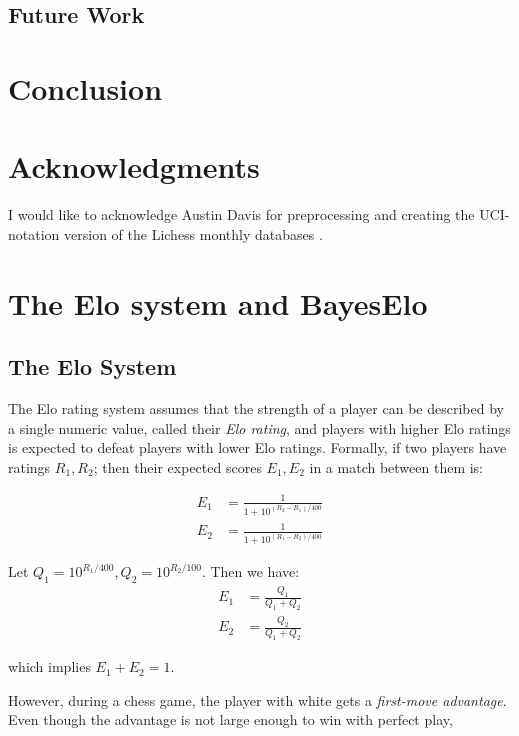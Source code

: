 \documentclass[11pt, a4paper]{article}
\begin{document}
\subsection{Future Work}

\section{Conclusion}

\section{Acknowledgments}

I would like to acknowledge Austin Davis for preprocessing and creating the UCI-notation version of the Lichess monthly databases \citep{davis-2024}.

\printbibliography

\pagebreak
\appendix
\section{The Elo system and BayesElo} 

\subsection{The Elo System} \label{subsec:the-elo-system}
The Elo rating system \citep{elo-1986} assumes that the strength of a player can be described by a single numeric value, called their \textit{Elo rating}, and players with higher Elo ratings is expected to defeat players with lower Elo ratings. Formally, if two players have ratings \(R_1, R_2\); then their expected scores \(E_1, E_2\) in a match between them is:

\begin{equation}
\begin{aligned}
E_1 &= \frac{1}{1 + 10^{(R_2 - R_1)/400}} \\
E_2 &= \frac{1}{1 + 10^{(R_1 - R_2)/400}}
\end{aligned}
\end{equation}

Let \(Q_1 = 10^{R_1 / 400}, Q_2 = 10^{R_2 / 100}\). Then we have:
\[
\begin{aligned}
E_1 &= \frac{Q_1}{Q_1 + Q_2} \\ 
E_2 &= \frac{Q_2}{Q_1 + Q_2} 
\end{aligned}
\]

which implies \(E_1 + E_2 = 1\). 

However, during a chess game, the player with white gets a \textit{first-move advantage}. Even though the advantage is not large enough to win with perfect play, 

\end{document}
